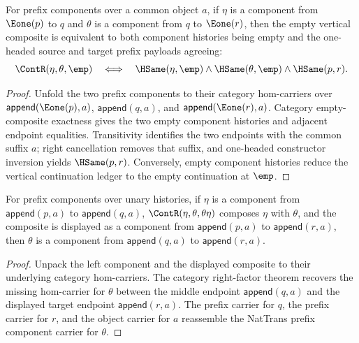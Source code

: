 \begin{theorem}
\label{thm:nattrans-prefix-component-e1-prefix-empty-vert-comp-iff}
For prefix components over a common object $a$, if $\eta$ is a component from
$\Eone(p)$ to $q$ and $\theta$ is a component from $q$ to $\Eone(r)$, then the
empty vertical composite is equivalent to both component histories being empty
and the one-headed source and target prefix payloads agreeing:
$$
\ContR(\eta,\theta,\emp)
\quad\Longleftrightarrow\quad
\HSame(\eta,\emp)\wedge\HSame(\theta,\emp)\wedge\HSame(p,r).
$$
\end{theorem}
\begin{proof}
Unfold the two prefix components to their category hom-carriers over
$\mathsf{append}(\Eone(p),a)$, $\mathsf{append}(q,a)$, and
$\mathsf{append}(\Eone(r),a)$. Category empty-composite exactness gives the
two empty component histories and adjacent endpoint equalities. Transitivity
identifies the two endpoints with the common suffix $a$; right cancellation
removes that suffix, and one-headed constructor inversion yields
$\HSame(p,r)$. Conversely, empty component histories reduce the vertical
continuation ledger to the empty continuation at $\emp$.
\end{proof}

\begin{theorem}
\label{thm:nattrans-prefix-component-carrier-vert-comp-right-factor}
For prefix components over unary histories, if $\eta$ is a component from
$\mathsf{append}(p,a)$ to $\mathsf{append}(q,a)$,
$\ContR(\eta,\theta,\theta\eta)$ composes $\eta$ with $\theta$, and the
composite is displayed as a component from $\mathsf{append}(p,a)$ to
$\mathsf{append}(r,a)$, then $\theta$ is a component from
$\mathsf{append}(q,a)$ to $\mathsf{append}(r,a)$.
\end{theorem}
\begin{proof}
Unpack the left component and the displayed composite to their underlying
category hom-carriers. The category right-factor theorem recovers the missing
hom-carrier for $\theta$ between the middle endpoint
$\mathsf{append}(q,a)$ and the displayed target endpoint
$\mathsf{append}(r,a)$. The prefix carrier for $q$, the prefix carrier for
$r$, and the object carrier for $a$ reassemble the NatTrans prefix component
carrier for $\theta$.
\end{proof}

